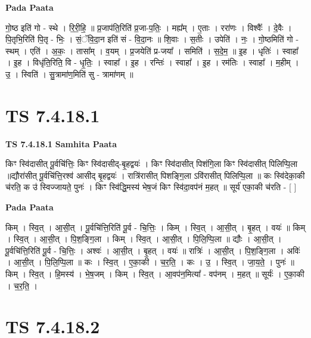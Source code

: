 \documentclass[17pt]{extarticle}
\begin{document}
\textbf{Pada Paata} \newline

गो॒ष्ठ इति॑ गो - स्थे । रि॒री॒हि॒ ॥ प्र॒जाप॑ति॒रिति॑ प्र॒जा-प॒तिः॒ । मह्य᳚म् । ए॒ताः । ररा॑णः । विश्वैः᳚ । दे॒वैः । पि॒तृभि॒रिति॑ पि॒तृ - भिः॒ । सं॒ॅवि॒दा॒न इति॑ सं - वि॒दा॒नः ॥ शि॒वाः । स॒तीः । उपेति॑ । नः॒ । गो॒ष्ठमिति॑ गो - स्थम् । एति॑ । अ॒कः॒ । तासा᳚म् । व॒यम् । प्र॒जयेति॑ प्र-जया᳚ । समिति॑ । स॒दे॒म॒ ॥ इ॒ह । धृतिः॑ । स्वाहा᳚ । इ॒ह । विधृ॑ति॒रिति॒ वि - धृ॒तिः॒ । स्वाहा᳚ । इ॒ह । रन्तिः॑ । स्वाहा᳚ । इ॒ह । रम॑तिः । स्वाहा᳚ । म॒हीम् । उ॒ । स्विति॑ । सु॒त्रामा॑ण॒मिति॑ सु - त्रामा॑णम् ॥  \newline




\section*{ TS 7.4.18.1 }

\textbf{TS 7.4.18.1 } \newline
\textbf{Samhita Paata} \newline

किꣳ स्वि॑दासीत् पू॒र्वचि॑त्तिः॒ किꣳ स्वि॑दासीद्-बृ॒हद्वयः॑ । किꣳ स्वि॑दासीत् पिशंगि॒ला किꣳ स्वि॑दासीत् पिलिप्पि॒ला ॥द्यौरा॑सीत् पू॒र्वचि॑त्ति॒रश्व॑ आसीद् बृ॒हद्वयः॑ । रात्रि॑रासीत् पिशङ्गि॒ला ऽवि॑रासीत् पिलिप्पि॒ला ॥ कः स्वि॑देका॒की च॑रति॒ क उ॑ स्विज्जायते॒ पुनः॑ । किꣳ स्वि॑द्धि॒मस्य॑ भेष॒जं किꣳ स्वि॑दा॒वप॑नं म॒हत् ॥ सूर्य॑ एका॒की च॑रति - [  ] \newline

\textbf{Pada Paata} \newline

किम् । स्वि॒त् । आ॒सी॒त् । पू॒र्वचि॑त्ति॒रिति॑ पू॒र्व - चि॒त्तिः॒ । किम् । स्वि॒त् । आ॒सी॒त् । बृ॒हत् । वयः॑ ॥ किम् । स्वि॒त् । आ॒सी॒त् । पि॒श॒ङ्गि॒ला । किम् । स्वि॒त् । आ॒सी॒त् । पि॒लि॒प्पि॒ला ॥ द्यौः । आ॒सी॒त् । पू॒र्वचि॑त्ति॒रिति॑ पू॒र्व - चि॒त्तिः॒ । अश्वः॑ । आ॒सी॒त् । बृ॒हत् । वयः॑ ॥ रात्रिः॑ । आ॒सी॒त् । पि॒श॒ङ्गि॒ला । अविः॑ । आ॒सी॒त् । पि॒लि॒प्पि॒ला ॥ कः । स्वि॒त् । ए॒का॒की । च॒र॒ति॒ । कः । उ॒ । स्वि॒त् । जा॒य॒ते॒ । पुनः॑ ॥ किम् । स्वि॒त् । हि॒मस्य॑ । भे॒ष॒जम् । किम् । स्वि॒त् । आ॒वप॑न॒मित्या᳚ - वप॑नम् । म॒हत् ॥ सूर्यः॑ । ए॒का॒की । च॒र॒ति॒ ।  \newline




\section*{ TS 7.4.18.2 }
\end{document}
